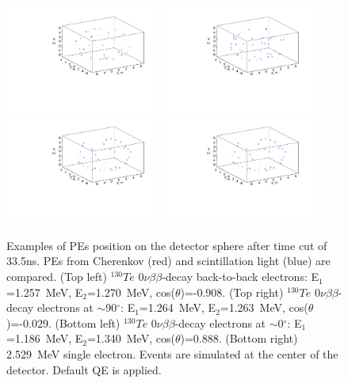 \documentclass[12pt,twoside,letterpaper]{article}
\newcommand{\vbb}{0\nu\beta\beta}
\newcommand{\Te}{^{130}Te}
\begin{document}
\begin{figure}[htb]
\centering
\includegraphics[angle=0,width=0.45\textwidth]{plots/hDisplay_Te130_evt124_e1257_e1270_cos-0908}
\includegraphics[angle=0,width=0.45\textwidth]{plots/hDisplay_Te130_evt131_e1264_e1263_cos-0029}
\includegraphics[angle=0,width=0.45\textwidth]{plots/hDisplay_Te130_evt352_e1186_e1340_cos0888}
\includegraphics[angle=0,width=0.45\textwidth]{plots/hDisplay_Te130_evt352_e1186_e1340_cos0888}
\caption{Examples of PEs position on the detector sphere after time cut of 33.5ns. PEs from Cherenkov (red) and scintillation light (blue) are compared. (Top left) $\Te$ $\vbb$-decay back-to-back electrons: E$_1$=1.257~MeV, E$_2$=1.270~MeV, cos($\theta$)=-0.908. (Top right) $\Te$ $\vbb$-decay electrons at $\sim$90$^{\circ}$:  E$_1$=1.264~MeV, E$_2$=1.263~MeV, cos($\theta$)=-0.029. (Bottom left) $\Te$ $\vbb$-decay electrons at $\sim$0$^{\circ}$:  E$_1$=1.186~MeV, E$_2$=1.340~MeV, cos($\theta$)=0.888. (Bottom right) 2.529~MeV single electron. Events are simulated at the center of the detector. Default QE is applied.}
\label{fig:Display_Te130}
\end{figure}
\end{document}
